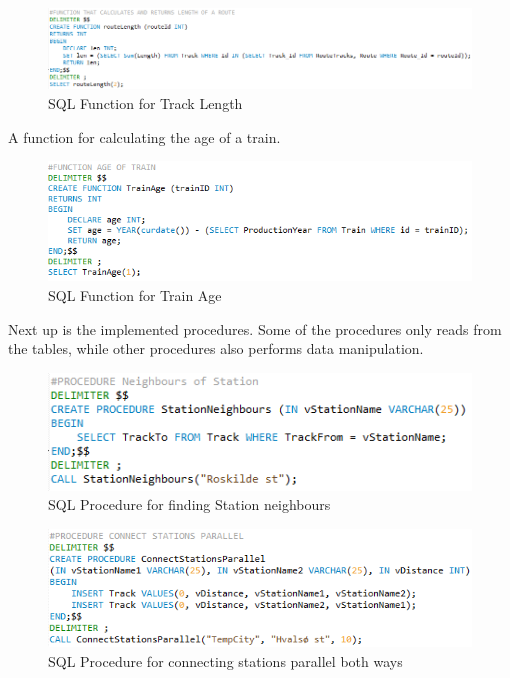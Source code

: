 \begin{figure}[ht!]
    \centering
    \includegraphics[width=1\textwidth]{img/SQL_FUNCTION_Length}
    \caption{SQL Function for Track Length}
\end{figure}

A function for calculating the age of a train.

\begin{figure}[ht!]
    \centering
    \includegraphics[width=1\textwidth]{img/SQL_FUNCTION_Age}
    \caption{SQL Function for Train Age}
\end{figure}

Next up is the implemented procedures. Some of the procedures only reads from 
the tables, while other procedures also performs data manipulation.

\begin{figure}[ht!]
    \centering
    \includegraphics[width=.7\textwidth]{img/SQL_PROCEDURE_Neighbours}
    \caption{SQL Procedure for finding Station neighbours}
\end{figure}

\begin{figure}[ht!]
    \centering
    \includegraphics[width=1\textwidth]{img/SQL_PROCEDURE_ConnectParallel}
    \caption{SQL Procedure for connecting stations parallel both ways}
\end{figure}

